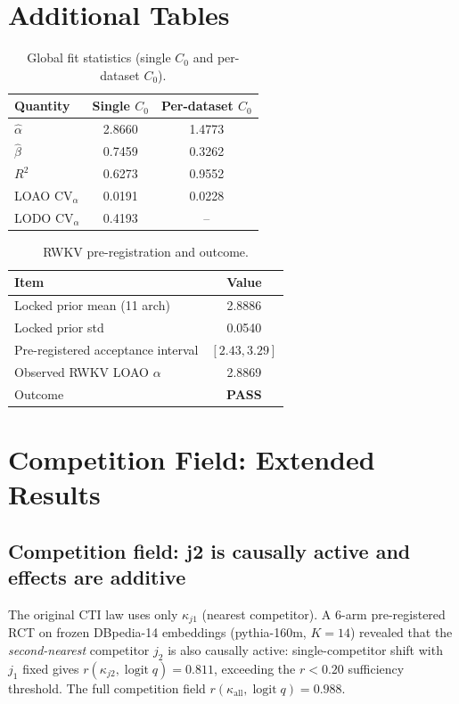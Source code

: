 \documentclass{article}
\DeclareMathOperator{\logit}{logit}
\begin{document}
\section{Additional Tables}

\begin{table}[h]
\centering
\caption{Global fit statistics (single $C_0$ and per-dataset $C_0$).}
\label{tab:global}
\small
\begin{tabular}{lcc}
\toprule
Quantity & Single $C_0$ & Per-dataset $C_0$ \\
\midrule
$\hat\alpha$ & 2.8660 & 1.4773 \\
$\hat\beta$ & 0.7459 & 0.3262 \\
$R^2$ & 0.6273 & 0.9552 \\
LOAO $\mathrm{CV}_\alpha$ & 0.0191 & 0.0228 \\
LODO $\mathrm{CV}_\alpha$ & 0.4193 & -- \\
\bottomrule
\end{tabular}
\end{table}

\begin{table}[h]
\centering
\caption{RWKV pre-registration and outcome.}
\label{tab:rwkv}
\small
\begin{tabular}{lc}
\toprule
Item & Value \\
\midrule
Locked prior mean (11 arch) & 2.8886 \\
Locked prior std & 0.0540 \\
Pre-registered acceptance interval & $[2.43, 3.29]$ \\
Observed RWKV LOAO $\alpha$ & 2.8869 \\
Outcome & \textbf{PASS} \\
\bottomrule
\end{tabular}
\end{table}



\section{Competition Field: Extended Results}
\label{app:competition-field}

\subsection{Competition field: j2 is causally active and effects are additive}
\label{subsec:competition-field}

The original CTI law uses only $\kappa_{j1}$ (nearest competitor). A 6-arm pre-registered RCT
on frozen DBpedia-14 embeddings (pythia-160m, $K=14$) revealed that the \emph{second-nearest}
competitor $j_2$ is also causally active: single-competitor shift with $j_1$ fixed gives
$r(\kappa_{j2},\logit q)=0.811$, exceeding the $r<0.20$ sufficiency threshold.
The full competition field $r(\kappa_{\mathrm{all}},\logit q)=0.988$.
\end{document}
